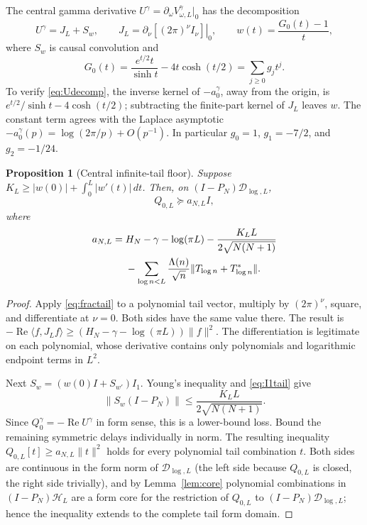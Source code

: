 \documentclass[11pt]{article}
\numberwithin{equation}{section}
\newtheorem{proposition}[theorem]{Proposition}
\theoremstyle{definition}
\theoremstyle{remark}
\newcommand{\HH}{\mathcal H}
\newcommand{\DD}{\mathcal D}
\newcommand{\Rea}{\operatorname{Re}}
\newcommand{\norm}[1]{\lVert#1\rVert}
\newcommand{\ip}[2]{\langle#1,#2\rangle}
\begin{document}
The central gamma derivative $U^\gamma=\partial_\omega V^\gamma_{\omega,L}|_0$
has the decomposition
\begin{equation}\label{eq:Udecomp}
 U^\gamma=J_L+S_w,\qquad
 J_L=\left.\partial_\nu[(2\pi)^\nu I_\nu]\right|_0,
 \qquad w(t)=\frac{G_0(t)-1}{t},
\end{equation}
where $S_w$ is causal convolution and
\begin{equation}\label{eq:G0}
 G_0(t)=\frac{e^{t/2}t}{\sinh t}-4t\cosh(t/2)
 =\sum_{j\ge0}g_jt^j.
\end{equation}
To verify \eqref{eq:Udecomp}, the inverse kernel of $-a^\gamma_0$, away
from the origin, is
$e^{t/2}/\sinh t-4\cosh(t/2)$; subtracting the finite-part kernel of
$J_L$ leaves $w$. The constant term agrees with the Laplace asymptotic
$-a^\gamma_0(p)=\log(2\pi/p)+O(p^{-1})$.
In particular $g_0=1$, $g_1=-7/2$, and $g_2=-1/24$.

\begin{proposition}[Central infinite-tail floor]\label{prop:tail}
Suppose
$K_L\ge |w(0)|+\int_0^L|w'(t)|\,dt$. Then, on
$(I-P_N)\DD_{\log,L}$,
\begin{equation}\label{eq:afloor}
 Q_{0,L}\succeq a_{N,L}I,
\end{equation}
where
\begin{align}
 a_{N,L}={}&H_N-\gamma-\log(\pi L)
 -\frac{K_LL}{2\sqrt{N(N+1)}}\notag\\
 &-\sum_{\log n<L}\frac{\Lambda(n)}{\sqrt n}
 \norm{T_{\log n}+T_{\log n}^*}.
 \label{eq:tailformula}
\end{align}
\end{proposition}
\begin{proof}
Apply \eqref{eq:fractail} to a polynomial tail vector, multiply by
$(2\pi)^\nu$, square, and differentiate at $\nu=0$. Both sides have the
same value there. The result is
$-\Rea\ip f{J_Lf}\ge(H_N-\gamma-\log(\pi L))\norm f^2$.
The differentiation is legitimate on each polynomial, whose derivative
contains only polynomials and logarithmic endpoint terms in $L^2$.

Next $S_w=(w(0)I+S_{w'})I_1$. Young's inequality and \eqref{eq:I1tail}
give
\[
 \norm{S_w(I-P_N)}\le\frac{K_LL}{2\sqrt{N(N+1)}}.
\]
Since $Q^\gamma_0=-\Rea U^\gamma$ in form sense, this is a lower-bound
loss. Bound the remaining symmetric delays individually in norm. The
resulting inequality $Q_{0,L}[t]\ge a_{N,L}\norm t^2$ holds for every
polynomial tail combination $t$. Both sides are continuous in the form norm of
$\DD_{\log,L}$ (the left side because $Q_{0,L}$ is closed, the right side
trivially), and by Lemma~\ref{lem:core} polynomial combinations in
$(I-P_N)\HH_L$ are a form core for the restriction of $Q_{0,L}$ to
$(I-P_N)\DD_{\log,L}$; hence the inequality extends to the complete tail form
domain.
\end{proof}
\end{document}
